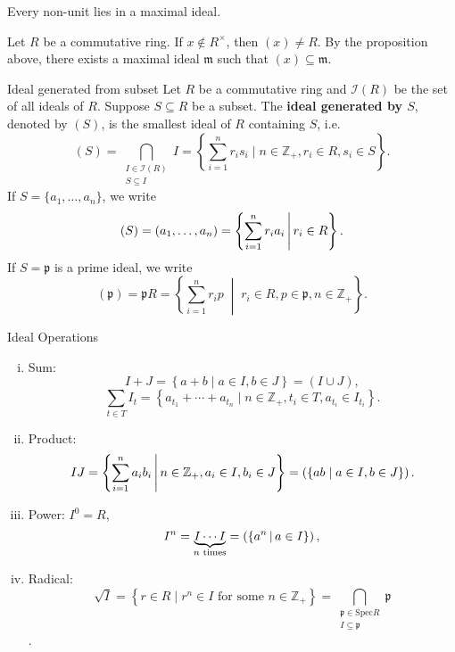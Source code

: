 \begin{corollary}{}{}
    Every non-unit lies in a maximal ideal.
\end{corollary}

\begin{prf}
    Let $R$ be a commutative ring. If $x\notin R^{\times}$, then $(x)\ne R$. By the proposition above, there exists a maximal ideal $\mathfrak{m}$ such that $(x)\subseteq \mathfrak{m}$.
\end{prf}

\begin{definition}{Ideal generated from subset}{}
    Let $R$ be a commutative ring and $\mathcal I(R)$ be the set of all ideals of $R$. Suppose $S\subseteq R$ be a subset. The \textbf{ideal generated by $S$}, denoted by $(S)$, is the smallest ideal of $R$ containing $S$, i.e. 
    \[
        (S)=\bigcap_{\substack{ I\in \mathcal I(R)\\S\subseteq I}}I=\left\{\sum_{i=1}^n r_is_i\mid n\in\mathbb{Z}_{+},r_i\in R,s_i\in S\right\}.
    \]
    If $S=\{a_1,\dots,a_n\}$, we write 
    \[
        (S)=(a_1,\dots,a_n)=\left\{\sum_{i=1}^n r_ia_i\,\middle\vert\,  r_i\in R\right\}.
    \]
    If $S=\mathfrak{p}$ is a prime ideal, we write 
    \[
    (\mathfrak{p})=\mathfrak{p}R = \left\{ \sum_{i=1}^n r_i p \;\middle|\; r_i \in R, p \in \mathfrak{p}, n \in \mathbb{Z}_{+} \right\}.
    \]
\end{definition}

\begin{definition}{Ideal Operations}{}
    \begin{enumerate}[(i)]
        \item Sum: $$I+J=\left\{a+b\mid a\in I,b\in J\right\}=\left(I\cup J\right),$$
        $$
        \sum_{t \in T} I_t=\left\{a_{t_1}+ \cdots +a_{t_n}\mid n\in\mathbb{Z}_{+},t_i\in T,a_{t_i}\in I_{t_i}\right\}.
        $$
        \item Product: $$IJ=\left\{\sum_{i=1}^n a_ib_i\,\middle\vert\, n\in\mathbb{Z}_{+},a_i\in I,b_i\in J\right\}=\left(\{ab\mid a\in I,b\in J\}\right).$$
        \item Power: $I^0=R$,
        \[
            I^n=\underbrace{I\cdots I}_{n\text{ times}}=\left(\{a^n\,\middle\vert\, a\in I\}\right), 
            \]
        \item Radical: \[
            \sqrt{I} = \left\{ r \in R \mid r^n \in I \text{ for some } n \in \mathbb{Z}_{+} \right\} = \bigcap_{\substack{\mathfrak{p} \in \mathrm{Spec} R \\ I \subseteq \mathfrak{p}}} \mathfrak{p}
            \].
    \end{enumerate}
\end{definition}

